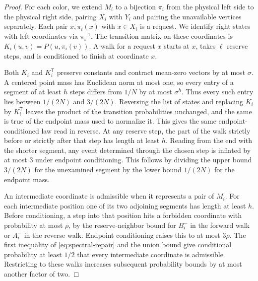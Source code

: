 \begin{proof}
For each color, we extend \(M_i\) to a bijection \(\pi_i\) from the physical left side to the physical right side, pairing \(X_i\) with \(Y_i\) and pairing the unavailable vertices separately. Each pair \(x,\pi_i(x)\) with \(x\in X_i\) is a request. We identify right states with left coordinates via \(\pi_i^{-1}\). The transition matrix on these coordinates is \(K_i(u,v)=P(u,\pi_i(v))\). A walk for a request \(x\) starts at \(x\), takes \(\ell\) reserve steps, and is conditioned to finish at coordinate \(x\).

Both \(K_i\) and \(K_i^{\mathsf T}\) preserve constants and contract mean-zero vectors by at most \(\sigma\). A centered point mass has Euclidean norm at most one, so every entry of a segment of at least \(h\) steps differs from \(1/N\) by at most \(\sigma^h\). Thus every such entry lies between \(1/(2N)\) and \(3/(2N)\). Reversing the list of states and replacing \(K_i\) by \(K_i^{\mathsf T}\) leaves the product of the transition probabilities unchanged, and the same is true of the endpoint mass used to normalize it. This gives the same endpoint-conditioned law read in reverse. At any reserve step, the part of the walk strictly before or strictly after that step has length at least \(h\). Reading from the end with the shorter segment, any event determined through the chosen step is inflated by at most \(3\) under endpoint conditioning. This follows by dividing the upper bound \(3/(2N)\) for the unexamined segment by the lower bound \(1/(2N)\) for the endpoint mass.

An intermediate coordinate is admissible when it represents a pair of \(M_i\). For each intermediate position one of its two adjoining segments has length at least \(h\). Before conditioning, a step into that position hits a forbidden coordinate with probability at most \(\rho\), by the reserve-neighbor bound for \(B_i^-\) in the forward walk or \(A_i^-\) in the reverse walk. Endpoint conditioning raises this to at most \(3\rho\). The first inequality of \eqref{eq:spectral-repair} and the union bound give conditional probability at least \(1/2\) that every intermediate coordinate is admissible. Restricting to these walks increases subsequent probability bounds by at most another factor of two.


\end{proof}
